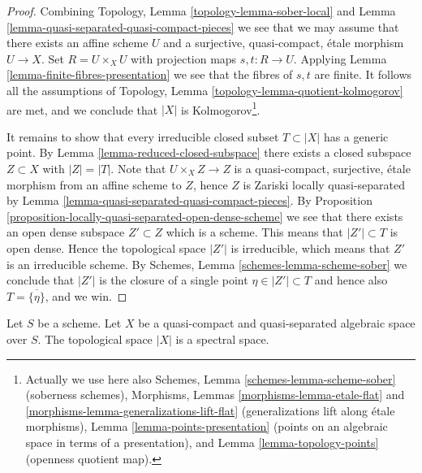 \begin{proof}
Combining
Topology, Lemma \ref{topology-lemma-sober-local}
and
Lemma \ref{lemma-quasi-separated-quasi-compact-pieces}
we see that we may assume that there exists an affine scheme $U$
and a surjective, quasi-compact, \'etale morphism $U \to X$.
Set $R = U \times_X U$ with projection maps $s, t : R \to U$. Applying
Lemma \ref{lemma-finite-fibres-presentation}
we see that the fibres of $s, t$ are finite. It follows all the assumptions of
Topology, Lemma \ref{topology-lemma-quotient-kolmogorov}
are met, and we conclude that $|X|$ is Kolmogorov\footnote{
Actually we use here also
Schemes, Lemma \ref{schemes-lemma-scheme-sober} (soberness schemes),
Morphisms, Lemmas \ref{morphisms-lemma-etale-flat}
and \ref{morphisms-lemma-generalizations-lift-flat} (generalizations
lift along \'etale morphisms),
Lemma \ref{lemma-points-presentation} (points on an algebraic space in
terms of a presentation), and
Lemma \ref{lemma-topology-points} (openness quotient map).}.

\medskip\noindent
It remains to show that every irreducible closed subset
$T \subset |X|$ has a generic point. By
Lemma \ref{lemma-reduced-closed-subspace}
there exists a closed subspace $Z \subset X$ with $|Z| = |T|$.
Note that $U \times_X Z \to Z$ is a quasi-compact, surjective, \'etale
morphism from an affine scheme to $Z$, hence $Z$ is Zariski locally
quasi-separated by
Lemma \ref{lemma-quasi-separated-quasi-compact-pieces}.
By
Proposition \ref{proposition-locally-quasi-separated-open-dense-scheme}
we see that there exists an open dense subspace $Z' \subset Z$
which is a scheme. This means that $|Z'| \subset T$ is open dense.
Hence the topological space $|Z'|$ is irreducible, which means that
$Z'$ is an irreducible scheme. By
Schemes, Lemma \ref{schemes-lemma-scheme-sober}
we conclude that $|Z'|$ is the closure of a single point
$\eta \in |Z'| \subset T$ and hence also $T = \overline{\{\eta\}}$, and we win.
\end{proof}

\begin{lemma}
\label{lemma-quasi-compact-quasi-separated-spectral}
Let $S$ be a scheme. Let $X$ be a quasi-compact and quasi-separated
algebraic space over $S$. The topological space $|X|$ is a spectral space.
\end{lemma}

